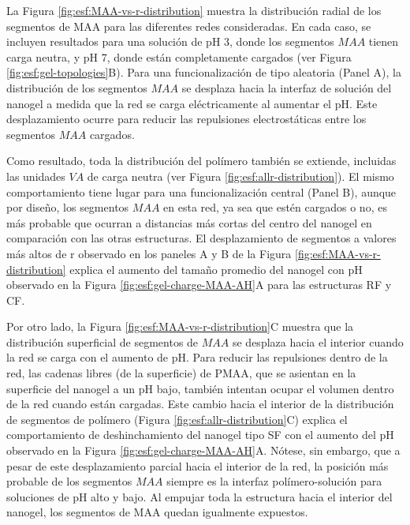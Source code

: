 La Figura \ref{fig:esf:MAA-vs-r-distribution} muestra la distribuci\'on radial de los segmentos de MAA para las diferentes redes consideradas. En cada caso, se incluyen resultados para una soluci\'on de pH 3, donde los segmentos $MAA$ tienen carga neutra, y pH 7, donde est\'an completamente cargados (ver Figura \ref{fig:esf:gel-topologies}B). Para una funcionalizaci\'on de tipo aleatoria (Panel A), la distribuci\'on de los segmentos $MAA$ se desplaza hacia la interfaz de soluci\'on del nanogel a medida que la red se carga el\'ectricamente al aumentar el pH. Este desplazamiento ocurre para reducir las repulsiones electrost\'aticas entre los segmentos $MAA$ cargados.

Como resultado, toda la distribuci\'on del pol\'imero tambi\'en se extiende, incluidas las unidades $VA$ de carga neutra (ver Figura \ref{fig:esf:allr-distribution}). El mismo comportamiento tiene lugar para una funcionalizaci\'on central (Panel B), aunque por dise\~no, los segmentos $MAA$ en esta red, ya sea que est\'en cargados o no, es m\'as probable que ocurran a distancias m\'as cortas del centro del nanogel en comparaci\'on con las otras estructuras. El desplazamiento de segmentos a valores m\'as altos de r observado en los paneles A y B de la Figura \ref{fig:esf:MAA-vs-r-distribution} explica el aumento del tama\~no promedio del nanogel con pH observado en la Figura \ref{fig:esf:gel-charge-MAA-AH}A para las estructuras RF y CF.

Por otro lado, la Figura \ref{fig:esf:MAA-vs-r-distribution}C muestra que la distribuci\'on superficial de segmentos de $MAA$ se desplaza hacia el interior cuando la red se carga con el aumento de pH. Para reducir las repulsiones dentro de la red, las cadenas libres (de la superficie) de PMAA, que se asientan en la superficie del nanogel a un pH bajo, tambi\'en intentan ocupar el volumen dentro de la red cuando est\'an cargadas. Este cambio hacia el interior de la distribuci\'on de segmentos de pol\'imero (Figura \ref{fig:esf:allr-distribution}C) explica el comportamiento de deshinchamiento del nanogel tipo SF con el aumento del pH observado en la Figura \ref{fig:esf:gel-charge-MAA-AH}A. N\'otese, sin embargo, que a pesar de este desplazamiento parcial hacia el interior de la red, la posici\'on m\'as probable de los segmentos $MAA$ siempre es la interfaz pol\'imero-soluci\'on para soluciones de pH alto y bajo. Al empujar toda la estructura hacia el interior del nanogel, los segmentos de MAA quedan igualmente expuestos.





